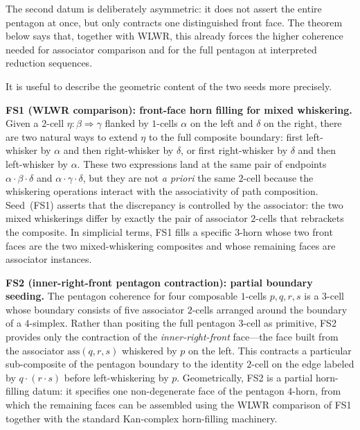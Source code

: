 \documentclass[webpdf,traditional,large,numbered]{oup-authoring-template}
\theoremstyle{thmstyleone}%
\theoremstyle{thmstyletwo}%
\theoremstyle{thmstylethree}%
\newcommand{\ass}{\mathrm{ass}}
\begin{document}
The second datum is deliberately asymmetric: it does not assert the entire
pentagon at once, but only contracts one distinguished front face.  The theorem
below says that, together with WLWR, this already forces the higher coherence
needed for associator comparison and for the full pentagon at interpreted
reduction sequences.

\medskip
It is useful to describe the geometric content of the two seeds more precisely.

\smallskip
\noindent
\textbf{FS1 (WLWR comparison): front-face horn filling for mixed whiskering.}\;
Given a $2$-cell $\eta:\beta\Rightarrow\gamma$ flanked by $1$-cells $\alpha$ on
the left and $\delta$ on the right, there are two natural ways to extend $\eta$
to the full composite boundary: first left-whisker by $\alpha$ and then
right-whisker by $\delta$, or first right-whisker by $\delta$ and then
left-whisker by $\alpha$.  These two expressions land at the same pair of
endpoints $\alpha\cdot\beta\cdot\delta$ and $\alpha\cdot\gamma\cdot\delta$, but
they are not \emph{a priori} the same $2$-cell because the whiskering operations
interact with the associativity of path composition.  Seed~(FS1) asserts that
the discrepancy is controlled by the associator: the two mixed whiskerings
differ by exactly the pair of associator $2$-cells that rebrackets the
composite.  In simplicial terms, FS1 fills a specific $3$-horn whose two
front faces are the two mixed-whiskering composites and whose remaining faces
are associator instances.

\smallskip
\noindent
\textbf{FS2 (inner-right-front pentagon contraction): partial boundary
seeding.}\;
The pentagon coherence for four composable $1$-cells $p,q,r,s$ is a $3$-cell
whose boundary consists of five associator $2$-cells arranged around the
boundary of a $4$-simplex.  Rather than positing the full pentagon $3$-cell as
primitive, FS2 provides only the contraction of the \emph{inner-right-front}
face---the face built from the associator $\ass(q,r,s)$ whiskered by $p$ on
the left.  This contracts a particular sub-composite of the pentagon boundary
to the identity $2$-cell on the edge labeled by $q\cdot(r\cdot s)$ before
left-whiskering by $p$.  Geometrically, FS2 is a partial horn-filling datum:
it specifies one non-degenerate face of the pentagon $4$-horn, from which the
remaining faces can be assembled using the WLWR comparison of FS1 together with
the standard Kan-complex horn-filling machinery.
\end{document}
